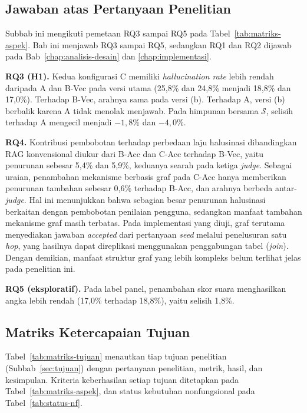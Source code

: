 \subsection{Jawaban atas Pertanyaan Penelitian}
\label{subsec:pembahasan-rumusan-masalah}

Subbab ini mengikuti pemetaan RQ3 sampai RQ5 pada Tabel~\ref{tab:matriks-aspek}. Bab ini menjawab RQ3 sampai RQ5, sedangkan RQ1 dan RQ2 dijawab pada Bab~\ref{chap:analisis-desain} dan \ref{chap:implementasi}.

\textbf{RQ3 (H1).} Kedua konfigurasi C memiliki \emph{hallucination rate} lebih rendah daripada A dan B-Vec pada versi utama (25,8\% dan 24,8\% menjadi 18,8\% dan 17,0\%). Terhadap B-Vec, arahnya sama pada versi (b). Terhadap A, versi (b) berbalik karena A tidak menolak menjawab. Pada himpunan bersama $\mathcal{S}$, selisih terhadap A mengecil menjadi $-1{,}8\%$ dan $-4{,}0\%$.

\textbf{RQ4.} Kontribusi pembobotan terhadap perbedaan laju halusinasi dibandingkan RAG konvensional diukur dari B-Acc dan C-Acc terhadap B-Vec, yaitu penurunan sebesar 5,4\% dan 5,9\%, keduanya searah pada ketiga \emph{judge}. Sebagai uraian, penambahan mekanisme berbasis graf pada C-Acc hanya memberikan penurunan tambahan sebesar 0,6\% terhadap B-Acc, dan arahnya berbeda antar-\emph{judge}. Hal ini menunjukkan bahwa sebagian besar penurunan halusinasi berkaitan dengan pembobotan penilaian pengguna, sedangkan manfaat tambahan mekanisme graf masih terbatas. Pada implementasi yang diuji, graf terutama menyediakan jawaban \emph{accepted} dari pertanyaan \emph{seed} melalui penelusuran satu \emph{hop}, yang hasilnya dapat direplikasi menggunakan penggabungan tabel (\emph{join}). Dengan demikian, manfaat struktur graf yang lebih kompleks belum terlihat jelas pada penelitian ini.

\textbf{RQ5 (eksploratif).} Pada label panel, penambahan skor suara menghasilkan angka lebih rendah (17,0\% terhadap 18,8\%), yaitu selisih 1,8\%.

\subsection{Matriks Ketercapaian Tujuan}
\label{subsec:matriks-tujuan}

Tabel~\ref{tab:matriks-tujuan} menautkan tiap tujuan penelitian (Subbab~\ref{sec:tujuan}) dengan pertanyaan penelitian, metrik, hasil, dan kesimpulan. Kriteria keberhasilan setiap tujuan ditetapkan pada Tabel~\ref{tab:matriks-aspek}, dan status kebutuhan nonfungsional pada Tabel~\ref{tab:status-nf}. 

